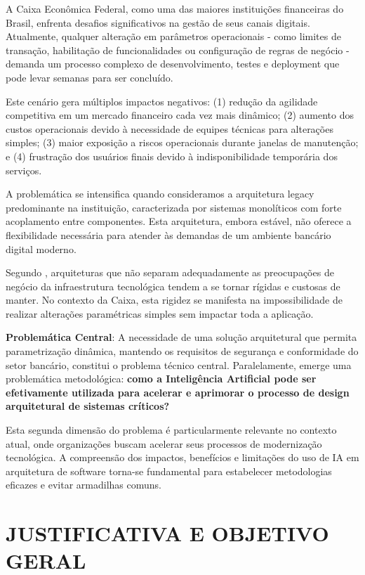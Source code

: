A Caixa Econômica Federal, como uma das maiores instituições financeiras do Brasil, enfrenta desafios significativos na gestão de seus canais digitais. Atualmente, qualquer alteração em parâmetros operacionais - como limites de transação, habilitação de funcionalidades ou configuração de regras de negócio - demanda um processo complexo de desenvolvimento, testes e deployment que pode levar semanas para ser concluído.

Este cenário gera múltiplos impactos negativos: (1) redução da agilidade competitiva em um mercado financeiro cada vez mais dinâmico; (2) aumento dos custos operacionais devido à necessidade de equipes técnicas para alterações simples; (3) maior exposição a riscos operacionais durante janelas de manutenção; e (4) frustração dos usuários finais devido à indisponibilidade temporária dos serviços.

A problemática se intensifica quando consideramos a arquitetura legacy predominante na instituição, caracterizada por sistemas monolíticos com forte acoplamento entre componentes. Esta arquitetura, embora estável, não oferece a flexibilidade necessária para atender às demandas de um ambiente bancário digital moderno.

Segundo , arquiteturas que não separam adequadamente as preocupações de negócio da infraestrutura tecnológica tendem a se tornar rígidas e custosas de manter. No contexto da Caixa, esta rigidez se manifesta na impossibilidade de realizar alterações paramétricas simples sem impactar toda a aplicação.

\textbf{Problemática Central}: A necessidade de uma solução arquitetural que permita parametrização dinâmica, mantendo os requisitos de segurança e conformidade do setor bancário, constitui o problema técnico central. Paralelamente, emerge uma problemática metodológica: \textbf{como a Inteligência Artificial pode ser efetivamente utilizada para acelerar e aprimorar o processo de design arquitetural de sistemas críticos?}

Esta segunda dimensão do problema é particularmente relevante no contexto atual, onde organizações buscam acelerar seus processos de modernização tecnológica. A compreensão dos impactos, benefícios e limitações do uso de IA em arquitetura de software torna-se fundamental para estabelecer metodologias eficazes e evitar armadilhas comuns.

\chapter{JUSTIFICATIVA E OBJETIVO GERAL}

